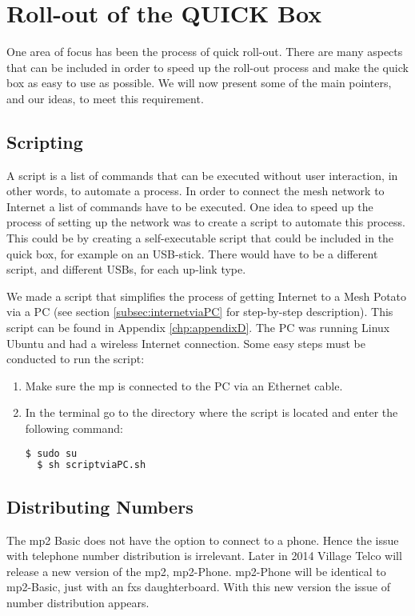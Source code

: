 \chapter{Roll-out of the QUICK Box}
\label{chp:manuals} 

One area of focus has been the process of quick roll-out. There are many aspects that can be included in order to speed up the roll-out process and make the \gls{quick} box as easy to use as possible. We will now present some of the main pointers, and our ideas, to meet this requirement.


\section{Scripting}
A script is a list of commands that can be executed without user interaction, in other words, to automate a process. In order to connect the mesh network to Internet a list of commands have to be executed. One idea to speed up the process of setting up the network was to create a script to automate this process. This could be by creating a self-executable script that could be included in the \gls{quick} box, for example on an USB-stick. There would have to be a different script, and different USBs, for each up-link type. 

We made a script that simplifies the process of getting Internet to a Mesh Potato via a PC (see section \ref{subsec:internetviaPC} for step-by-step description). This script can be found in Appendix \ref{chp:appendixD}. The PC was running Linux Ubuntu and had a wireless Internet connection. Some easy steps must be conducted to run the script:
\begin{enumerate}
\item Make sure the \gls{mp} is connected to the PC via an Ethernet cable.
\item In the terminal go to the directory where the script is located and enter the following command:
\noindent
\begin{lstlisting}[language=bash]
  $ sudo su
  $ sh scriptviaPC.sh
\end{lstlisting}
\end{enumerate}

\section{Distributing Numbers}
The \gls{mp2} Basic does not have the option to connect to a phone. Hence the issue with telephone number distribution is irrelevant. Later in 2014 Village Telco will release a new version of the \gls{mp2}, \gls{mp2}-Phone. \gls{mp2}-Phone will be identical to \gls{mp2}-Basic, just with an \gls{fxs} daughterboard. With this new version the issue of number distribution appears. 

